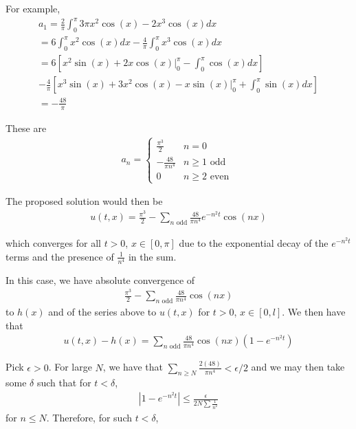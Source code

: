 \documentclass{article}
\begin{document}
	For example,
	\begin{align*}
		a_{1} = \frac{2}{\pi} \int_{0}^{\pi} 3 \pi x^{2}\cos(x) - 2x^{3} \cos(x) dx \\
		= 6\int_{0}^{\pi} x^{2}\cos(x) dx - \frac{4}{\pi} \int_{0}^{\pi} x^{3}\cos(x)dx\\
		= 6\left[ x^{2}\sin(x)+2x\cos(x)|_{0}^{\pi} - \int_{0}^{\pi} \cos(x)dx\right] \\-\frac{4}{\pi}\left[x^{3}\sin(x)+3x^{2}\cos(x) - x\sin(x)|_{0}^{\pi} +\int_{0}^{\pi} \sin(x)dx \right] \\
		= -\frac{48}{\pi}
	\end{align*}
	
	
	
	These are 
	\begin{align*}
		a_{n} = \begin{cases}
			\frac{\pi^{3}}{2} & n=0 \\ -\frac{48}{\pi n^{4}} & n \geq 1  \text{ odd }\\ 0 & n \geq 2 \text{ even } 
		\end{cases}
	\end{align*}
	
	The proposed solution would then be 
	\begin{align*}
		u(t,x) = \frac{\pi^{3}}{2} - \sum_{n \text{ odd}} \frac{48}{\pi n^{4}} e^{-n^{2}t} \cos(nx)
	\end{align*}
	
	which converges for all $t>0$, $x \in [0,\pi]$ due to the exponential decay of the $e^{-n^{2}t}$ terms and the presence of $\frac{1}{n^{4}}$ in the sum. 
	
	In this case, we have absolute convergence of 
	\begin{align*}
		\frac{\pi^{3}}{2} - \sum_{n \text{ odd}} \frac{48}{\pi n^{4}}  \cos(nx)
	\end{align*}
	to $h(x)$ and of the series above to $u(t,x)$ for $t>0$, $x \in [0,l]$. We then have that 
	\begin{align*}
		u(t,x) - h(x) = \sum_{n \text{ odd}} \frac{48}{\pi n^{4}}  \cos(nx)(1-e^{-n^{2}t})
	\end{align*}
	
	Pick $\epsilon > 0$. For large $N$, we have that $\sum_{n \geq N} \frac{2(48)}{\pi n^{4}} < \epsilon/2$ and we may then take some $\delta$ such that for $t < \delta$, 
	\begin{align*}
		|1 - e^{-n^{2}t}| \leq \frac{\epsilon}{2N \sum \frac{1}{n^{2}}}
	\end{align*}
	for $n \leq N$. Therefore, for such $t<\delta$,
	
\end{document}
